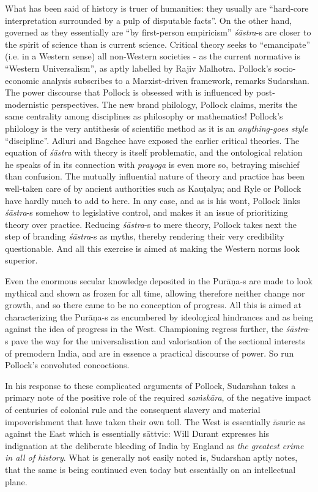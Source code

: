 What has been said of history is truer of humanities: they usually are “hard-core interpretation surrounded by a pulp of disputable facts”. On the other hand, governed as they essentially are “by first-person empiricism” {\sl śāstra}-s are closer to the spirit of science than is current science. Critical theory seeks to “emancipate” (i.e. in a Western sense) all non-Western societies - as the current normative is “Western Universalism”, as aptly labelled by Rajiv Malhotra. Pollock’s socio-economic analysis subscribes to a Marxist-driven framework, remarks Sudarshan. The power discourse that Pollock is obsessed with is influenced by post-modernistic perspectives. The new brand philology, Pollock claims, merits the same centrality among disciplines as philosophy or mathematics! Pollock’s philology is the very antithesis of scientific method as it is an {\sl anything-goes style} “discipline”. Adluri and Bagchee have exposed the earlier critical theories. The equation of {\sl śāstra} with theory is itself problematic, and the ontological relation he speaks of in its connection with {\sl prayoga} is even more so, betraying mischief than confusion. The mutually influential nature of theory and practice has been well-taken care of by ancient authorities such as Kauṭalya; and Ryle or Pollock have hardly much to add to here. In any case, and as is his wont, Pollock links {\sl śāstra}-s somehow to legislative control, and makes it an issue of prioritizing theory over practice. Reducing {\sl śāstra}-s to mere theory, Pollock takes next the step of branding {\sl śāstra}-s as myths, thereby rendering their very credibility questionable. And all this exercise is aimed at making the Western norms look superior.

Even the enormous secular knowledge deposited in the Purāṇa-s are made to look mythical and shown as frozen for all time, allowing therefore neither change nor growth, and so there came to be no conception of progress. All this is aimed at characterizing the Purāṇa-s as encumbered by ideological hindrances and as being against the idea of progress in the West. Championing regress further, the {\sl śāstra}-s pave the way for the universalisation and valorisation of the sectional interests of premodern India, and are in essence a practical discourse of power. So run Pollock’s convoluted concoctions.

In his response to these complicated arguments of Pollock, Sudarshan takes a primary note of the positive role of the required {\sl saṁskāra}, of the negative impact of centuries of colonial rule and the consequent slavery and material impoverishment that have taken their own toll. The West is essentially āsuric as against the East which is essentially sāttvic: Will Durant expresses his indignation at the deliberate bleeding of India by England as {\sl the greatest crime in all of history}. What is generally not easily noted is, Sudarshan aptly notes, that the same is being continued even today but essentially on an intellectual plane.

